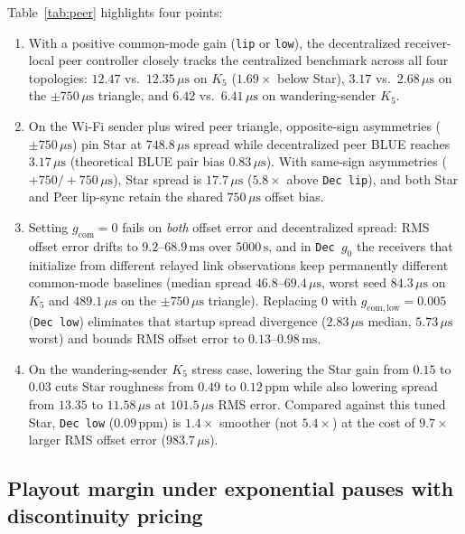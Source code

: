 \documentclass[11pt,a4paper]{article}
\theoremstyle{definition}
\begin{document}
Table~\ref{tab:peer} highlights four points:
\begin{enumerate}
\item With a positive common-mode gain (\texttt{lip} or \texttt{low}), the
  decentralized receiver-local peer controller closely tracks the centralized
  benchmark across all four topologies: $12.47$ vs.\ $12.35\,\mu\text{s}$ on
  $K_5$ ($1.69\times$ below Star), $3.17$ vs.\ $2.68\,\mu\text{s}$ on the
  $\pm 750\,\mu\text{s}$ triangle, and $6.42$ vs.\ $6.41\,\mu\text{s}$ on
  wandering-sender $K_5$.
\item On the Wi-Fi sender plus wired peer triangle, opposite-sign asymmetries
  ($\pm 750\,\mu\text{s}$) pin Star at $748.8\,\mu\text{s}$ spread while
  decentralized peer BLUE reaches $3.17\,\mu\text{s}$ (theoretical BLUE pair
  bias $0.83\,\mu\text{s}$). With same-sign asymmetries ($+750 / {+}750\,\mu\text{s}$),
  Star spread is $17.7\,\mu\text{s}$ ($5.8\times$ above \texttt{Dec lip}), and
  both Star and Peer lip-sync retain the shared $750\,\mu\text{s}$ offset bias.
\item Setting $g_{\mathrm{com}} = 0$ fails on \emph{both} offset error and
  decentralized spread: RMS offset error drifts to $9.2$--$68.9\,\text{ms}$
  over $5000\,\text{s}$, and in \texttt{Dec $g_0$} the receivers that initialize
  from different relayed link observations keep permanently different
  common-mode baselines (median spread $46.8$--$69.4\,\mu\text{s}$, worst seed
  $84.3\,\mu\text{s}$ on $K_5$ and $489.1\,\mu\text{s}$ on the $\pm 750\,\mu\text{s}$
  triangle). Replacing $0$ with $g_{\mathrm{com,low}} = 0.005$ (\texttt{Dec low})
  eliminates that startup spread divergence ($2.83\,\mu\text{s}$ median,
  $5.73\,\mu\text{s}$ worst) and bounds RMS offset error to
  $0.13$--$0.98\,\text{ms}$.
\item On the wandering-sender $K_5$ stress case, lowering the Star gain from
  $0.15$ to $0.03$ cuts Star roughness from $0.49$ to $0.12\,\text{ppm}$ while
  also lowering spread from $13.35$ to $11.58\,\mu\text{s}$ at $101.5\,\mu\text{s}$
  RMS error. Compared against this tuned Star, \texttt{Dec low} ($0.09\,\text{ppm}$)
  is $1.4\times$ smoother (not $5.4\times$) at the cost of $9.7\times$ larger
  RMS offset error ($983.7\,\mu\text{s}$).
\end{enumerate}

\subsection{Playout margin under exponential pauses with discontinuity pricing}
\label{sec:sim-margin}
\end{document}
